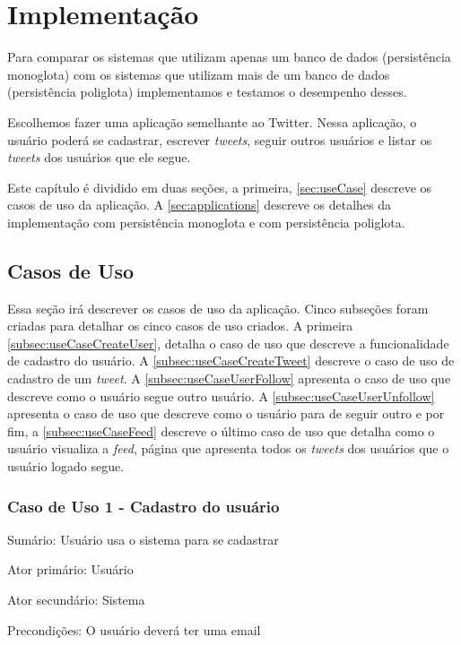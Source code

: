 \chapter{Implementação}
\label{chap:implementacao}

Para comparar os sistemas que utilizam apenas um banco de dados (persistência monoglota) com os sistemas que utilizam mais de um banco de dados (persistência poliglota) implementamos e testamos o desempenho desses.

Escolhemos fazer uma aplicação semelhante ao Twitter. Nessa aplicação, o usuário poderá se cadastrar, escrever \textit{tweets}, seguir outros usuários e listar os \textit{tweets} dos usuários que ele segue.

Este capítulo é dividido em duas seções, a primeira, \autoref{sec:useCase} descreve os casos de uso da aplicação. A \autoref{sec:applications} descreve os detalhes da implementação com persistência monoglota e com persistência poliglota.

\section{Casos de Uso}
\label{sec:useCase}
Essa seção irá descrever os casos de uso da aplicação. Cinco subseções foram criadas para detalhar os cinco casos de uso criados. A primeira \autoref{subsec:useCaseCreateUser}, detalha o caso de uso que descreve a funcionalidade de cadastro do usuário. A \autoref{subsec:useCaseCreateTweet} descreve o caso de uso de cadastro de um \textit{tweet}. A \autoref{subsec:useCaseUserFollow} apresenta o caso de uso que descreve como o usuário segue outro usuário. A \autoref{subsec:useCaseUserUnfollow} apresenta o caso de uso que descreve como o usuário para de seguir outro e por fim, a \autoref{subsec:useCaseFeed} descreve o último caso de uso que detalha como o usuário visualiza a \textit{feed}, página que apresenta todos os \textit{tweets} dos usuários que o usuário logado segue.


\subsection{Caso de Uso 1 - Cadastro do usuário}
\label{subsec:useCaseCreateUser}

Sumário: Usuário usa o sistema para se cadastrar

Ator primário: Usuário

Ator secundário: Sistema

Precondições: O usuário deverá ter uma email

